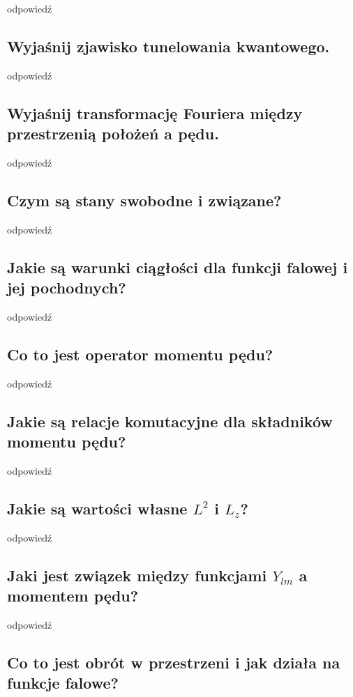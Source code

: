 odpowiedź

\subsection{Wyjaśnij zjawisko tunelowania kwantowego.}

odpowiedź

\subsection{Wyjaśnij transformację Fouriera między przestrzenią położeń a pędu.}

odpowiedź

\subsection{Czym są stany swobodne i związane?}

odpowiedź

\subsection{Jakie są warunki ciągłości dla funkcji falowej i jej pochodnych?}

odpowiedź

\subsection{Co to jest operator momentu pędu?}

odpowiedź

\subsection{Jakie są relacje komutacyjne dla składników momentu pędu?}

odpowiedź

\subsection{Jakie są wartości własne $L^2$ i $L_z$?}

odpowiedź

\subsection{Jaki jest związek między funkcjami $Y_{lm}$ a momentem pędu?}

odpowiedź

\subsection{Co to jest obrót w przestrzeni i jak działa na funkcje falowe?}

